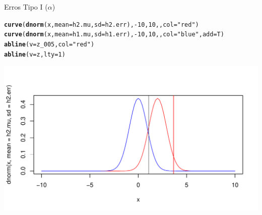 \documentclass{beamer}\usepackage[]{graphicx}\usepackage[]{color}
\makeatletter
\def\maxwidth{ %
  \ifdim\Gin@nat@width>\linewidth
    \linewidth
  \else
    \Gin@nat@width
  \fi
}
\newcommand{\hlnum}[1]{\textcolor[rgb]{0.686,0.059,0.569}{#1}}%
\newcommand{\hlstr}[1]{\textcolor[rgb]{0.192,0.494,0.8}{#1}}%
\newcommand{\hlopt}[1]{\textcolor[rgb]{0,0,0}{#1}}%
\newcommand{\hlstd}[1]{\textcolor[rgb]{0.345,0.345,0.345}{#1}}%
\newcommand{\hlkwc}[1]{\textcolor[rgb]{0.333,0.667,0.333}{#1}}%
\newcommand{\hlkwd}[1]{\textcolor[rgb]{0.737,0.353,0.396}{\textbf{#1}}}%
\newenvironment{kframe}{%
 \def\at@end@of@kframe{}%
 \ifinner\ifhmode%
  \def\at@end@of@kframe{\end{minipage}}%
  \begin{minipage}{\columnwidth}%
 \fi\fi%
 \def\FrameCommand##1{\hskip\@totalleftmargin \hskip-\fboxsep
 \colorbox{shadecolor}{##1}\hskip-\fboxsep
     \hskip-\linewidth \hskip-\@totalleftmargin \hskip\columnwidth}%
 \MakeFramed {\advance\hsize-\width
   \@totalleftmargin\z@ \linewidth\hsize
   \@setminipage}}%
 {\par\unskip\endMakeFramed%
 \at@end@of@kframe}
\newenvironment{knitrout}{}{} %
\renewenvironment{knitrout}{\setlength{\topsep}{0mm}}{}
\makeatother
\begin{document}
\begin{frame}[fragile]{Erros Tipo I ($\alpha$)}

\begin{knitrout}\tiny
{}\color{fgcolor}\begin{kframe}
\begin{alltt}
\hlkwd{curve}\hlstd{(}\hlkwd{dnorm}\hlstd{(x,} \hlkwc{mean} \hlstd{= h2.mu,} \hlkwc{sd} \hlstd{= h2.err),} \hlopt{-}\hlnum{10}\hlstd{,} \hlnum{10}\hlstd{, ,} \hlkwc{col} \hlstd{=} \hlstr{"red"}\hlstd{)}
\hlkwd{curve}\hlstd{(}\hlkwd{dnorm}\hlstd{(x,} \hlkwc{mean} \hlstd{= h1.mu,} \hlkwc{sd} \hlstd{= h1.err),} \hlopt{-}\hlnum{10}\hlstd{,} \hlnum{10}\hlstd{, ,} \hlkwc{col} \hlstd{=} \hlstr{"blue"}\hlstd{,} \hlkwc{add} \hlstd{= T)}
\hlkwd{abline}\hlstd{(}\hlkwc{v} \hlstd{= z_005,} \hlkwc{col} \hlstd{=} \hlstr{"red"}\hlstd{)}
\hlkwd{abline}\hlstd{(}\hlkwc{v} \hlstd{= z,} \hlkwc{lty} \hlstd{=} \hlnum{1}\hlstd{)}
\end{alltt}
\end{kframe}
\includegraphics[width=\maxwidth]{figure/erro2-1} 

\end{knitrout}

\end{frame}
\end{document}
